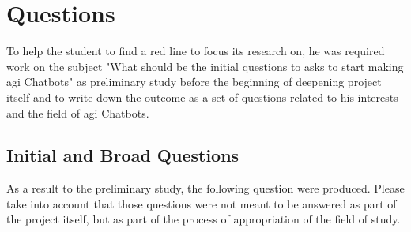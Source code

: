 \chapter{Questions}
\label{chap:questions}

To help the student to find a red line to focus its research on, he was required work on the subject "What should be the initial questions to asks to start making \gls{agi} Chatbots" as preliminary study before the beginning of deepening project itself and to write down the outcome as a set of questions related to his interests and the field of \gls{agi} Chatbots.

\section{Initial and Broad Questions}
As a result to the preliminary study, the following question were produced. Please take into account that those questions were not meant to be answered as part of the project itself, but as part of the process of appropriation of the field of study.

